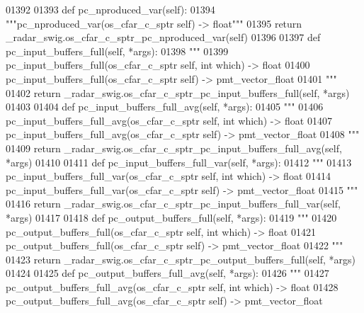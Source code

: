 \begin{DoxyCode}
{{{{{{01392 
01393     \textcolor{keyword}{def }pc_nproduced_var(self):
01394         \textcolor{stringliteral}{"""pc\_nproduced\_var(os\_cfar\_c\_sptr self) -> float"""}
01395         \textcolor{keywordflow}{return} \_radar\_swig.os\_cfar\_c\_sptr\_pc\_nproduced\_var(self)
01396 
01397     \textcolor{keyword}{def }pc_input_buffers_full(self, *args):
01398         \textcolor{stringliteral}{"""}
01399 \textcolor{stringliteral}{        pc\_input\_buffers\_full(os\_cfar\_c\_sptr self, int which) -> float}
01400 \textcolor{stringliteral}{        pc\_input\_buffers\_full(os\_cfar\_c\_sptr self) -> pmt\_vector\_float}
01401 \textcolor{stringliteral}{        """}
01402         \textcolor{keywordflow}{return} \_radar\_swig.os\_cfar\_c\_sptr\_pc\_input\_buffers\_full(self, *args)
01403 
01404     \textcolor{keyword}{def }pc_input_buffers_full_avg(self, *args):
01405         \textcolor{stringliteral}{"""}
01406 \textcolor{stringliteral}{        pc\_input\_buffers\_full\_avg(os\_cfar\_c\_sptr self, int which) -> float}
01407 \textcolor{stringliteral}{        pc\_input\_buffers\_full\_avg(os\_cfar\_c\_sptr self) -> pmt\_vector\_float}
01408 \textcolor{stringliteral}{        """}
01409         \textcolor{keywordflow}{return} \_radar\_swig.os\_cfar\_c\_sptr\_pc\_input\_buffers\_full\_avg(self, *args)
01410 
01411     \textcolor{keyword}{def }pc_input_buffers_full_var(self, *args):
01412         \textcolor{stringliteral}{"""}
01413 \textcolor{stringliteral}{        pc\_input\_buffers\_full\_var(os\_cfar\_c\_sptr self, int which) -> float}
01414 \textcolor{stringliteral}{        pc\_input\_buffers\_full\_var(os\_cfar\_c\_sptr self) -> pmt\_vector\_float}
01415 \textcolor{stringliteral}{        """}
01416         \textcolor{keywordflow}{return} \_radar\_swig.os\_cfar\_c\_sptr\_pc\_input\_buffers\_full\_var(self, *args)
01417 
01418     \textcolor{keyword}{def }pc_output_buffers_full(self, *args):
01419         \textcolor{stringliteral}{"""}
01420 \textcolor{stringliteral}{        pc\_output\_buffers\_full(os\_cfar\_c\_sptr self, int which) -> float}
01421 \textcolor{stringliteral}{        pc\_output\_buffers\_full(os\_cfar\_c\_sptr self) -> pmt\_vector\_float}
01422 \textcolor{stringliteral}{        """}
01423         \textcolor{keywordflow}{return} \_radar\_swig.os\_cfar\_c\_sptr\_pc\_output\_buffers\_full(self, *args)
01424 
01425     \textcolor{keyword}{def }pc_output_buffers_full_avg(self, *args):
01426         \textcolor{stringliteral}{"""}
01427 \textcolor{stringliteral}{        pc\_output\_buffers\_full\_avg(os\_cfar\_c\_sptr self, int which) -> float}
01428 \textcolor{stringliteral}{        pc\_output\_buffers\_full\_avg(os\_cfar\_c\_sptr self) -> pmt\_vector\_float}
}}}}}}
\end{DoxyCode}
